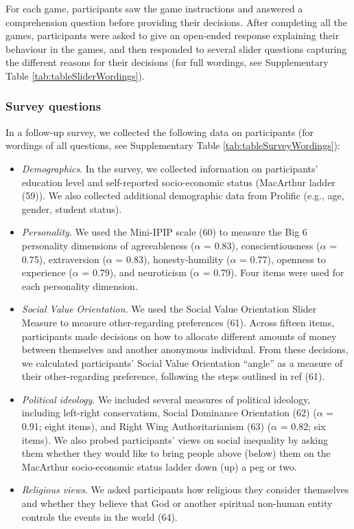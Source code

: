 \documentclass[
  man, donotrepeattitle,floatsintext]{apa6}
\providecommand{\tightlist}{%
  \setlength{\itemsep}{0pt}\setlength{\parskip}{0pt}}
\begin{document}
For each game, participants saw the game instructions and answered a
comprehension question before providing their decisions. After completing all
the games, participants were asked to give an open-ended response explaining
their behaviour in the games, and then responded to several slider questions
capturing the different reasons for their decisions (for full wordings, see
Supplementary Table \ref{tab:tableSliderWordings}).

\hypertarget{survey-questions}{%
\subsubsection{Survey questions}\label{survey-questions}}

In a follow-up survey, we collected the following data on participants (for
wordings of all questions, see Supplementary Table
\ref{tab:tableSurveyWordings}):

\begin{itemize}
\tightlist
\item
  \emph{Demographics}. In the survey, we collected information on participants'
  education level and self-reported socio-economic status (MacArthur ladder
  (59)). We also collected additional demographic data from Prolific
  (e.g., age, gender, student status).
\item
  \emph{Personality}. We used the Mini-IPIP scale (60) to measure the Big 6
  personality dimensions of agreeableness (\(\alpha\) =
  0.83), conscientiousness (\(\alpha\) =
  0.75), extraversion (\(\alpha\) =
  0.83), honesty-humility (\(\alpha\) =
  0.77), openness to experience (\(\alpha\) =
  0.79), and neuroticism (\(\alpha\) =
  0.79). Four items were used for each
  personality dimension.
\item
  \emph{Social Value Orientation}. We used the Social Value Orientation Slider
  Measure to measure other-regarding preferences (61). Across fifteen
  items, participants made decisions on how to allocate different amounts of
  money between themselves and another anonymous individual. From these
  decisions, we calculated participants' Social Value Orientation ``angle'' as a
  measure of their other-regarding preference, following the steps outlined in
  ref (61).
\item
  \emph{Political ideology}. We included several measures of political ideology,
  including left-right conservatism, Social Dominance Orientation (62)
  (\(\alpha\) = 0.91; eight items), and Right
  Wing Authoritarianism (63) (\(\alpha\) =
  0.82; six items). We also probed
  participants' views on social inequality by asking them whether they would
  like to bring people above (below) them on the MacArthur socio-economic status
  ladder down (up) a peg or two.
\item
  \emph{Religious views}. We asked participants how religious they consider
  themselves and whether they believe that God or another spiritual non-human
  entity controls the events in the world (64).
\end{itemize}
\end{document}
